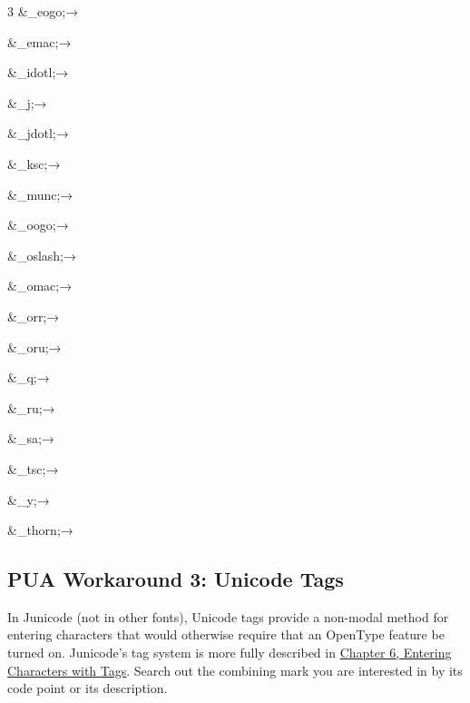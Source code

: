 \begin{multicols}{3}
\&{\textcompwordmark}\_eogo;\hfill→\hfill{}

\&{\textcompwordmark}\_emac;\hfill→\hfill{}

\&\_{\textcompwordmark}idotl;\hfill→\hfill{}

\&\_{\textcompwordmark}j;\hfill→\hfill{}

\&\_{\textcompwordmark}jdotl;\hfill→\hfill{}

\&\_{\textcompwordmark}ksc;\hfill→\hfill{}

\&\_{\textcompwordmark}munc;\hfill→\hfill{}

\&\_{\textcompwordmark}oogo;\hfill→\hfill{}

\&\_{\textcompwordmark}oslash;\hfill→\hfill{}

\&\_{\textcompwordmark}omac;\hfill→\hfill{}

\&\_{\textcompwordmark}orr;\hfill→\hfill{}

\&\_{\textcompwordmark}oru;\hfill→\hfill{}

\&\_{\textcompwordmark}q;\hfill→\hfill{}

\&\_{\textcompwordmark}ru;\hfill→\hfill{}

\&\_{\textcompwordmark}sa;\hfill→\hfill{}

\&\_{\textcompwordmark}tsc;\hfill→\hfill{}

\&\_{\textcompwordmark}y;\hfill→\hfill{}

\&\_{\textcompwordmark}thorn;\hfill→\hfill{}
\end{multicols}


\subsection{PUA Workaround 3: Unicode Tags}

In Junicode (not in other fonts), Unicode tags provide a non-modal method for entering characters 
that would otherwise require that an OpenType feature be turned on. Junicode’s tag system 
is more fully described in \hyperlink{tagchapter}{Chapter 6, Entering Characters with Tags}.
Search out the combining mark you are interested in by its code point or its description.


